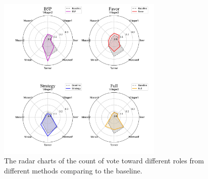 \begin{figure}[ht]
  \centering
  \includegraphics[width=0.7\textwidth]{img/JV_radar.jpg}
  \caption{ The  radar charts of the count of vote toward different roles from different methods comparing to the baseline. }
\label{fig:FullGameStudy_JV_radar}
    \vspace{-1em}
\end{figure}



\begin{table}[ht]
  \renewcommand{\arraystretch}{1.3}
  \setlength{\tabcolsep}{10pt}
      \centering
  \caption{The win rate for the Villager-team, Werewolf-team and Tanner-team. The 'Random' means the vote rate if all the agents vote randomly. Each arrow indicates at least a 5\% difference from the baseline and so on. Up arrow means increase, and down arrow means decrease. 
  }
  \label{tab:FullGameStudy_WinRate}
\end{table}\

